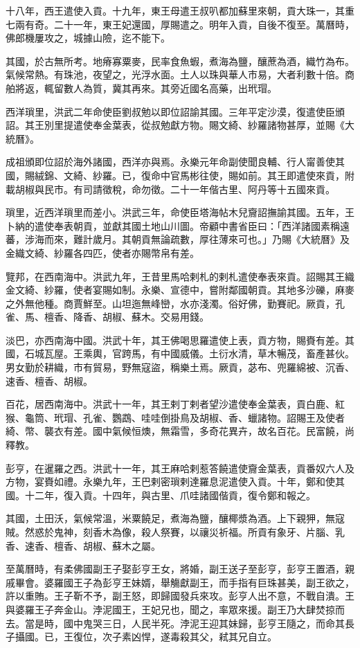 \begin{pinyinscope}
十八年，西王遣使入貢。十九年，東王母遣王叔叭都加蘇里來朝，貢大珠一，其重七兩有奇。二十一年，東王妃還國，厚賜遣之。明年入貢，自後不復至。萬曆時，佛郎機屢攻之，城據山險，迄不能下。

其國，於古無所考。地瘠寡粟麥，民率食魚蝦，煮海為鹽，釀蔗為酒，織竹為布。氣候常熱。有珠池，夜望之，光浮水面。土人以珠與華人市易，大者利數十倍。商舶將返，輒留數人為質，冀其再來。其旁近國名高藥，出玳瑁。

西洋瑣里，洪武二年命使臣劉叔勉以即位詔諭其國。三年平定沙漠，復遣使臣頒詔。其王別里提遣使奉金葉表，從叔勉獻方物。賜文綺、紗羅諸物甚厚，並賜《大統曆》。

成祖頒即位詔於海外諸國，西洋亦與焉。永樂元年命副使聞良輔、行人甯善使其國，賜絨錦、文綺、紗羅。已，復命中官馬彬往使，賜如前。其王即遣使來貢，附載胡椒與民市。有司請徵稅，命勿徵。二十一年偕古里、阿丹等十五國來貢。

瑣里，近西洋瑣里而差小。洪武三年，命使臣塔海帖木兒齎詔撫諭其國。五年，王卜納的遣使奉表朝貢，並獻其國土地山川圖。帝顧中書省臣曰：「西洋諸國素稱遠蕃，涉海而來，難計歲月。其朝貢無論疏數，厚往薄來可也。」乃賜《大統曆》及金織文綺、紗羅各四匹，使者亦賜幣帛有差。

覽邦，在西南海中。洪武九年，王昔里馬哈剌札的剌札遣使奉表來貢。詔賜其王織金文綺、紗羅，使者宴賜如制。永樂、宣德中，嘗附鄰國朝貢。其地多沙礫，麻麥之外無他種。商賈鮮至。山坦迤無峰巒，水亦淺濁。俗好佛，勤賽祀。厥貢，孔雀、馬、檀香、降香、胡椒、蘇木。交易用錢。

淡巴，亦西南海中國。洪武十年，其王佛喝思羅遣使上表，貢方物，賜賚有差。其國，石城瓦屋。王乘輿，官跨馬，有中國威儀。土衍水清，草木暢茂，畜產甚伙。男女勤於耕織，市有貿易，野無寇盜，稱樂土焉。厥貢，苾布、兜羅綿被、沉香、速香、檀香、胡椒。

百花，居西南海中。洪武十一年，其王剌丁剌者望沙遣使奉金葉表，貢白鹿、紅猴、龜筒、玳瑁、孔雀、鸚鵡、哇哇倒掛鳥及胡椒、香、蠟諸物。詔賜王及使者綺、幣、襲衣有差。國中氣候恒燠，無霜雪，多奇花異卉，故名百花。民富饒，尚釋教。

彭亨，在暹羅之西。洪武十一年，其王麻哈剌惹答饒遣使齎金葉表，貢番奴六人及方物，宴賚如禮。永樂九年，王巴剌密瑣剌達羅息泥遣使入貢。十年，鄭和使其國。十二年，復入貢。十四年，與古里、爪哇諸國偕貢，復令鄭和報之。

其國，土田沃，氣候常溫，米粟饒足，煮海為鹽，釀椰漿為酒。上下親狎，無寇賊。然惑於鬼神，刻香木為像，殺人祭賽，以禳災祈福。所貢有象牙、片腦、乳香、速香、檀香、胡椒、蘇木之屬。

至萬曆時，有柔佛國副王子娶彭亨王女，將婚，副王送子至彭亨，彭亨王置酒，親戚畢會。婆羅國王子為彭亨王妹婿，舉觴獻副王，而手指有巨珠甚美，副王欲之，許以重賄。王子靳不予，副王怒，即歸國發兵來攻。彭亨人出不意，不戰自潰。王與婆羅王子奔金山。浡泥國王，王妃兄也，聞之，率眾來援。副王乃大肆焚掠而去。當是時，國中鬼哭三日，人民半死。浡泥王迎其妹歸，彭亨王隨之，而命其長子攝國。已，王復位，次子素凶悍，遂毒殺其父，弒其兄自立。


\end{pinyinscope}
